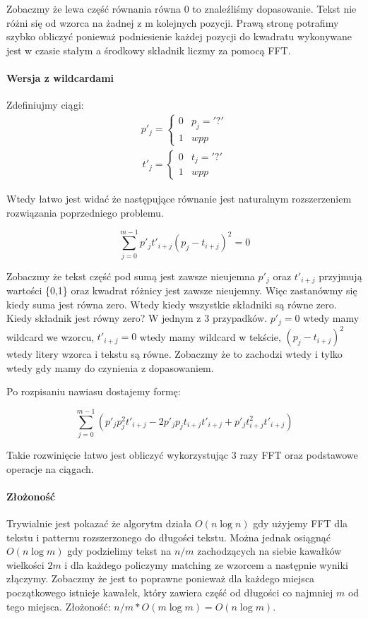 Zobaczmy że lewa część równania równa 0 to znaleźliśmy dopasowanie. Tekst nie różni się od wzorca na żadnej z m kolejnych pozycji. Prawą stronę potrafimy szybko obliczyć ponieważ podniesienie każdej pozycji do kwadratu wykonywane jest w czasie stałym a środkowy składnik liczmy za pomocą FFT.

\paragraph{Wersja z wildcardami}

Zdefiniujmy ciągi:
\begin{align*}
p'_j =
    \begin{cases}
    0  &  p_j = '?'\\
    1  &  wpp
    \end{cases}
\end{align*}
\begin{align*}
t'_j =
    \begin{cases}
    0  &  t_j = '?'\\
    1  &  wpp
    \end{cases}
\end{align*}

Wtedy łatwo jest widać że następujące równanie jest naturalnym rozszerzeniem rozwiązania poprzedniego problemu.

    $$ \sum_{j=0}^{m-1} p'_{j}t'_{i+j}(p_j - t_{i+j})^2 = 0 $$

Zobaczmy że tekst część pod sumą jest zawsze nieujemna $p'_{j}$ oraz $t'_{i+j}$ przyjmują wartości \{0,1\} oraz kwadrat różnicy jest zawsze nieujemny. Więc zastanówmy się kiedy suma jest równa zero. Wtedy kiedy wszystkie składniki są równe zero. Kiedy składnik jest równy zero? W jednym z 3 przypadków. $p'_{j} = 0$ wtedy mamy wildcard we wzorcu, $t'_{i+j}=0$ wtedy mamy wildcard w tekście, $(p_j - t_{i+j})^2$ wtedy litery wzorca i tekstu są równe. Zobaczmy że to zachodzi wtedy i tylko wtedy gdy mamy do czynienia z dopasowaniem.

Po rozpisaniu nawiasu dostajemy formę:

$$ \sum_{j=0}^{m-1} (p'_{j}p^2_{j}t'_{i+j} - 2 p'_{j}p_{j}t_{i+j}t'_{i+j}+p'_{j}t^2_{i+j}t'_{i+j}) $$

Takie rozwinięcie łatwo jest obliczyć wykorzystując 3 razy FFT oraz podstawowe operacje na ciągach.

\paragraph{Złożoność}

Trywialnie jest pokazać że algorytm działa $O(n \log n)$ gdy użyjemy FFT dla tekstu i patternu rozszerzonego do długości tekstu. Można jednak osiągnąć $O(n \log m)$ gdy podzielimy tekst na $n/m$ zachodzących na siebie kawałków wielkości $2m$ i dla każdego policzymy matching ze wzorcem a następnie wyniki złączymy. Zobaczmy że jest to poprawne ponieważ dla każdego miejsca początkowego istnieje kawałek, który zawiera część od długości co najmniej $m$ od tego miejsca. Złożoność: $n/m * O(m\log m)=O(n\log m)$.
